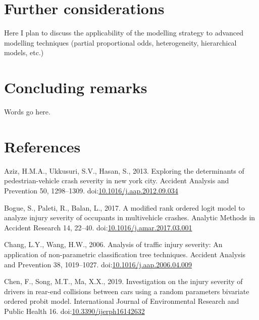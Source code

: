 \documentclass[]{elsarticle} %
\begin{document}
\hypertarget{sec:further-considerations}{%
\section{Further considerations}\label{sec:further-considerations}}

Here I plan to discuss the applicability of the modelling strategy to
advanced modelling techniques (partial proportional odds, heterogeneity,
hierarchical models, etc.)

\hypertarget{sec:concluding-remarks}{%
\section{Concluding remarks}\label{sec:concluding-remarks}}

Words go here.

\hypertarget{references}{%
\section*{References}\label{references}}

\hypertarget{refs}{}
\leavevmode\hypertarget{ref-Aziz2013exploring}{}%
Aziz, H.M.A., Ukkusuri, S.V., Hasan, S., 2013. Exploring the
determinants of pedestrian-vehicle crash severity in new york city.
Accident Analysis and Prevention 50, 1298--1309.
doi:\href{https://doi.org/10.1016/j.aap.2012.09.034}{10.1016/j.aap.2012.09.034}

\leavevmode\hypertarget{ref-Bogue2017modified}{}%
Bogue, S., Paleti, R., Balan, L., 2017. A modified rank ordered logit
model to analyze injury severity of occupants in multivehicle crashes.
Analytic Methods in Accident Research 14, 22--40.
doi:\href{https://doi.org/10.1016/j.amar.2017.03.001}{10.1016/j.amar.2017.03.001}

\leavevmode\hypertarget{ref-Chang2006analysis}{}%
Chang, L.Y., Wang, H.W., 2006. Analysis of traffic injury severity: An
application of non-parametric classification tree techniques. Accident
Analysis and Prevention 38, 1019--1027.
doi:\href{https://doi.org/10.1016/j.aap.2006.04.009}{10.1016/j.aap.2006.04.009}

\leavevmode\hypertarget{ref-Chen2019investigation}{}%
Chen, F., Song, M.T., Ma, X.X., 2019. Investigation on the injury
severity of drivers in rear-end collisions between cars using a random
parameters bivariate ordered probit model. International Journal of
Environmental Research and Public Health 16.
doi:\href{https://doi.org/10.3390/ijerph16142632}{10.3390/ijerph16142632}
\end{document}
